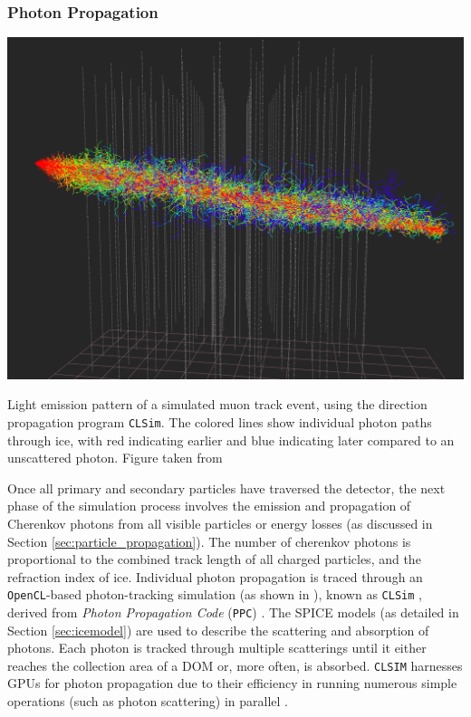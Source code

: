 \subsubsection*{Photon Propagation}
\begin{marginfigure}
    \includegraphics{./figures/EventSample/Icecube_muon_photons.png}
    \caption{Light emission pattern of a simulated muon track event, using the direction propagation program \texttt{CLSim}. The colored lines show individual photon paths through ice, with red indicating earlier and blue indicating later compared to an unscattered photon. Figure taken from \cite{IC_photon_picture}}
    
\end{marginfigure}
Once all primary and secondary particles have traversed the detector, the next phase of the simulation process involves the emission and propagation of Cherenkov photons from all visible particles or energy losses (as discussed in Section \ref{sec:particle_propagation}). The number of cherenkov photons is proportional to the combined track length of all charged particles, and the refraction index of ice. Individual photon propagation is traced through an \texttt{OpenCL}-based photon-tracking simulation (as shown in ), known as \texttt{CLSim} , derived from \emph{Photon Propagation Code} (\texttt{PPC}) . The SPICE models (as detailed in Section \ref{sec:icemodel})  are used to describe the scattering and absorption of photons. Each photon is tracked through multiple scatterings until it either reaches the collection area of a DOM or, more often, is absorbed. \texttt{CLSIM} harnesses GPUs for photon propagation due to their efficiency in running numerous simple operations (such as photon scattering) in parallel \cite{PPC_dima}. 


